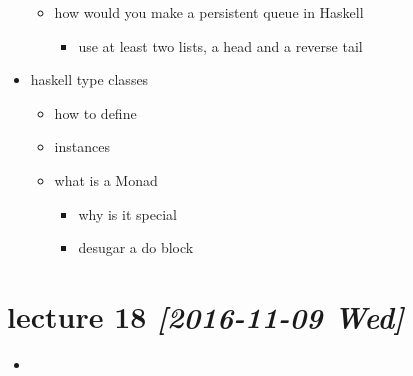 \documentclass[11pt]{article}
\begin{document}
\begin{itemize}
\begin{itemize}
\item how would you make a persistent queue in Haskell
\begin{itemize}
\item use at least two lists, a head and a reverse tail
\end{itemize}
\end{itemize}
\item haskell type classes
\begin{itemize}
\item how to define
\item instances
\item what is a Monad
\begin{itemize}
\item why is it special
\item desugar a do block
\end{itemize}
\end{itemize}
\end{itemize}
\section{lecture 18 \textit{[2016-11-09 Wed]}}
\label{sec-16}
\begin{itemize}
\item 
\end{itemize}
\end{document}
